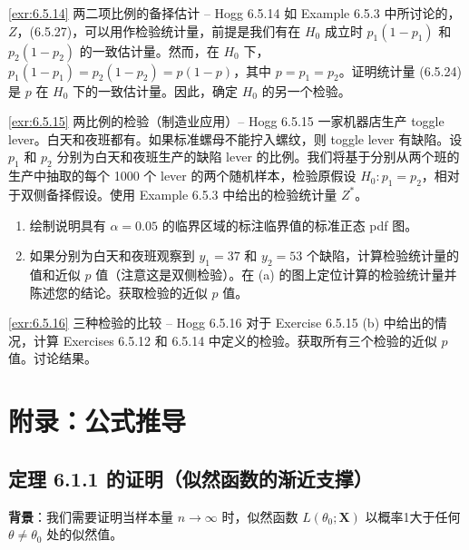 \begin{exercise}{\ref{exr:6.5.14} 两二项比例的备择估计 – Hogg 6.5.14}\label{exr:6.5.14}
如 Example 6.5.3 中所讨论的，$Z$，(6.5.27)，可以用作检验统计量，前提是我们有在 $H_0$ 成立时 $p_1(1-p_1)$ 和 $p_2(1-p_2)$ 的一致估计量。然而，在 $H_0$ 下，$p_1(1-p_1) = p_2(1-p_2) = p(1-p)$，其中 $p = p_1 = p_2$。证明统计量 (6.5.24) 是 $p$ 在 $H_0$ 下的一致估计量。因此，确定 $H_0$ 的另一个检验。
\end{exercise}

\begin{exercise}{\ref{exr:6.5.15} 两比例的检验（制造业应用）– Hogg 6.5.15}\label{exr:6.5.15}
一家机器店生产 toggle lever。白天和夜班都有。如果标准螺母不能拧入螺纹，则 toggle lever 有缺陷。设 $p_1$ 和 $p_2$ 分别为白天和夜班生产的缺陷 lever 的比例。我们将基于分别从两个班的生产中抽取的每个 1000 个 lever 的两个随机样本，检验原假设 $H_0: p_1 = p_2$，相对于双侧备择假设。使用 Example 6.5.3 中给出的检验统计量 $Z^*$。

\begin{enumerate}
\item[(a)] 绘制说明具有 $\alpha=0.05$ 的临界区域的标注临界值的标准正态 pdf 图。
\item[(b)] 如果分别为白天和夜班观察到 $y_1=37$ 和 $y_2=53$ 个缺陷，计算检验统计量的值和近似 $p$ 值（注意这是双侧检验）。在 (a) 的图上定位计算的检验统计量并陈述您的结论。获取检验的近似 $p$ 值。
\end{enumerate}
\end{exercise}

\begin{exercise}{\ref{exr:6.5.16} 三种检验的比较 – Hogg 6.5.16}\label{exr:6.5.16}
对于 Exercise 6.5.15 (b) 中给出的情况，计算 Exercises 6.5.12 和 6.5.14 中定义的检验。获取所有三个检验的近似 $p$ 值。讨论结果。
\end{exercise}


\section{附录：公式推导}\label{sec:appendix-ch6}

\subsection{定理 6.1.1 的证明（似然函数的渐近支撑）}\label{sec:proof-likelihood-asymptotic}

\textbf{背景}：我们需要证明当样本量 $n \to \infty$ 时，似然函数 $L(\theta_0; \mathbf{X})$ 以概率1大于任何 $\theta \neq \theta_0$ 处的似然值。

